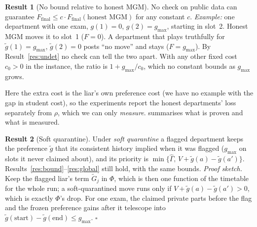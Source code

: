 \documentclass{article}
\theoremstyle{definition}
\newtheorem{result}{Result}
\newcommand{\1}{\mathbf{1}}
\newcommand{\gmax}{g_{\max}}
\begin{document}
\begin{result}[No bound relative to honest MGM]
\label{res:neg}
No check on public data can guarantee $F_{\text{final}}\le c\cdot F_{\text{final}}(\text{honest MGM})$ for any constant $c$. \emph{Example:} one department with one exam, $g(1)=0$, $g(2)=\gmax$, starting in slot~2. Honest MGM moves it to slot~1 ($F=0$). A department that plays truthfully for $\tilde g(1)=\gmax$, $\tilde g(2)=0$ posts ``no move'' and stays ($F=\gmax$). By Result~\ref{res:undet} no check can tell the two apart. With any other fixed cost $c_0>0$ in the instance, the ratio is $1+\gmax/c_0$, which no constant bounds as $\gmax$ grows.
\end{result}
Here the extra cost is the liar's own preference cost (we have no example with the gap in student cost), so the experiments report the honest departments' loss separately from $\rho$, which we can only \emph{measure}.  summarises what is proven and what is measured.

\begin{result}[Soft quarantine]
\label{res:soft}
Under \emph{soft quarantine} a flagged department keeps the preference $\tilde g$ that its consistent history implied when it was flagged ($\gmax$ on slots it never claimed about), and its priority is $\min\{\hat\Gamma,\,V+\tilde g(a)-\tilde g(a')\}$. Results~\ref{res:bound}--\ref{res:global} still hold, with the same bounds. \emph{Proof sketch.} Keep the flagged liar's term $\tilde G_j$ in $\Phi$, which is then one function of the timetable for the whole run; a soft-quarantined move runs only if $V+\tilde g(a)-\tilde g(a')>0$, which is exactly $\Phi$'s drop. For one exam, the claimed private parts before the flag and the frozen preference gains after it telescope into $\tilde g(\text{start})-\tilde g(\text{end})\le\gmax$. $\square$
\end{result}


\end{document}
